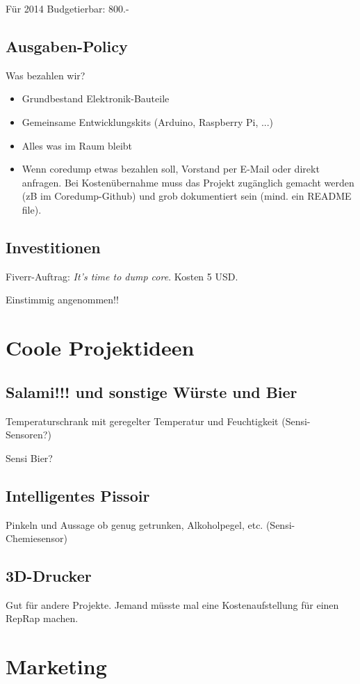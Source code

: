 \documentclass[10pt,a4paper,parskip,fleqn]{scrartcl}
\newcommand{\ul}{\begin{itemize}[itemsep=-0.3em,topsep=-0.3em]}
\newcommand{\lu}{\end{itemize}}
\newcommand{\li}{\item}
\begin{document}
Für 2014 Budgetierbar: 800.-

\subsection{Ausgaben-Policy}

Was bezahlen wir?

\ul
	\li Grundbestand Elektronik-Bauteile
	\li Gemeinsame Entwicklungskits (Arduino, Raspberry Pi, ...)
	\li Alles was im Raum bleibt
	\li Wenn coredump etwas bezahlen soll, Vorstand per E-Mail oder direkt
	anfragen. Bei Kostenübernahme muss das Projekt zugänglich gemacht werden (zB
	im Coredump-Github) und grob dokumentiert sein (mind. ein README file).
\lu

\subsection{Investitionen}

Fiverr-Auftrag: \textit{It's time to dump core}. Kosten 5 USD.

Einstimmig angenommen!!

\section{Coole Projektideen}

\subsection{Salami!!! und sonstige Würste und Bier}

Temperaturschrank mit geregelter Temperatur und Feuchtigkeit (Sensi-Sensoren?)

Sensi Bier?

\subsection{Intelligentes Pissoir}

Pinkeln und Aussage ob genug getrunken, Alkoholpegel, etc. (Sensi-Chemiesensor)


\subsection{3D-Drucker}

Gut für andere Projekte. Jemand müsste mal eine Kostenaufstellung für einen
RepRap machen.

\section{Marketing}
\end{document}
